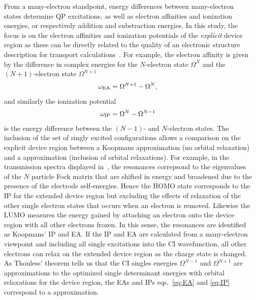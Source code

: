 From a many-electron standpoint, energy differences between many-electron
states determine \ac{QP} excitations, as well as electron affinities
and ionization energies, or respectively addition and substraction energies. 
In this study, the focus is on the electron affinities and ionization
potentials of the {\it explicit} device region as these can be directly
related to the quality of an electronic structure description for transport
calculations~\cite{golden}. For example, the electron affinity is given
by the difference in complex energies for the $N$-electron state $\Omega^N$
and the $(N+1)$-electron state $\Omega^{N+1}$
\numparts
\begin{equation}
\label{eq:EA}
\omega_{\rm EA} = \Omega^{N+1} -\Omega^N,
\end{equation}
and similarly the ionization potential
\begin{equation}
\label{eq:IP}
\omega_{\rm IP} =  \Omega^N - \Omega^{N-1}
\end{equation}
\endnumparts
is the energy difference between the $(N-1)$- and $N$-electron states.
The inclusion of the set of singly excited configurations allows a
comparison on the explicit device region between a Koopmans approximation 
(no orbital relaxation) and a \dscf approximation (inclusion of
orbital relaxations).  For example, in the transmission spectra displayed
in~, the resonances correpsond to the eigenvalues of
the $N$ particle Fock matrix that are shifted in energy and broadened due
to the presence of the electrode self-energies. Hence the \ac{HOMO} state
corresponds to the IP for the extended device region but excluding the
effects of relaxation of the other single electron states that occurs
when an electron is removed. Likewise the LUMO measures the energy gained
by attaching an electron onto the device region with all other electrons
frozen. In this sense, the resonances are identified as Koopmans' IP and
EA. If the IP and EA are calculated from a many-electron viewpoint and
including all single excitations into the CI wavefunction,
all other electrons can relax on the extended device region as the charge
state is changed. As Thouless' theorem tells us that the CI singles
energies $\Omega^{N-1}$ and $\Omega^{N+1}$ are approximations to the optimized
single determinant energies with orbital relaxations for the device region,
the EAs and IPs eqs.~\ref{eq:EA} and \ref{eq:IP} correspond to a \dscf
approximation. 

